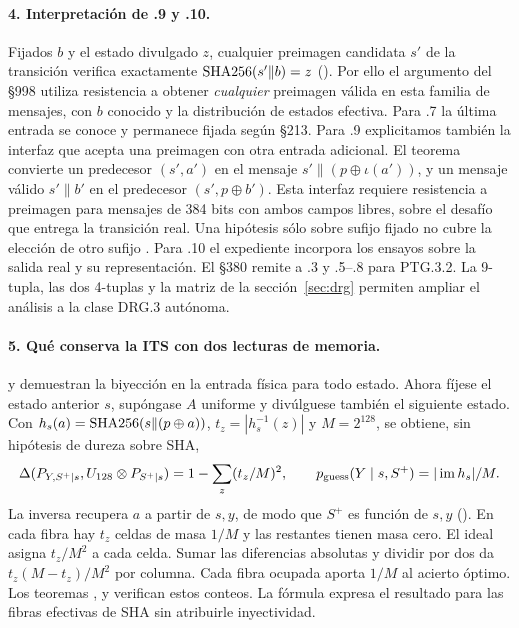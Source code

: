 \paragraph{4. Interpretación de .9 y .10.}
Fijados \(b\) y el estado divulgado \(z\), cualquier preimagen candidata
\(s'\) de la transición verifica exactamente \(\operatorname{SHA256}(s'\|b)=z\)
(). Por ello el argumento del §998 utiliza
resistencia a obtener \emph{cualquier} preimagen válida en esta familia
de mensajes, con \(b\) conocido y la distribución de estados efectiva.
Para .7 la última entrada se conoce y permanece fijada según §213.
Para .9 explicitamos también la interfaz que acepta una preimagen con
otra entrada adicional. El teorema  convierte
un predecesor \((s',a')\) en el mensaje \(s'\|(p\oplus\iota(a'))\),
y un mensaje válido \(s'\|b'\) en el predecesor
\((s',p\oplus b')\). Esta interfaz requiere resistencia a preimagen
para mensajes de 384 bits con ambos campos libres, sobre el desafío
que entrega la transición real. Una hipótesis sólo sobre sufijo fijado
no cubre la elección de otro sufijo \cite[§§212--215]{ais}.
Para .10 el expediente incorpora los ensayos sobre la salida real y su
representación. El §380 remite a .3 y .5--.8 para PTG.3.2.
La 9-tupla, las dos 4-tuplas y la matriz de la sección~\ref{sec:drg}
permiten ampliar el análisis a la clase DRG.3 autónoma.

\paragraph{5. Qué conserva la ITS con dos lecturas de memoria.}
 y  demuestran la biyección en
la entrada física para todo estado. Ahora fíjese el estado anterior \(s\),
supóngase \(A\) uniforme y divúlguese también el siguiente estado.
Con \(h_s(a)=\operatorname{SHA256}(s\|(p\oplus a))\), \(t_z=|h_s^{-1}(z)|\) y \(M=2^{128}\),
se obtiene, sin hipótesis de dureza sobre SHA,
\[
  \Delta(P_{Y,S^+\mid s}, U_{128}\otimes P_{S^+\mid s})
  =1-\sum_z (t_z/M)^2,\qquad
  p_{\mathrm{guess}}(Y\mid s,S^+)=|\operatorname{im}h_s|/M .
\]
La inversa recupera \(a\) a partir de \(s,y\), de modo que \(S^+\) es función de
\(s,y\) (). En cada fibra hay \(t_z\) celdas de masa
\(1/M\) y las restantes tienen masa cero. El ideal asigna \(t_z/M^2\)
a cada celda. Sumar las diferencias absolutas y dividir por dos da
\(t_z(M-t_z)/M^2\) por columna. Cada fibra ocupada aporta \(1/M\) al acierto
óptimo. Los teoremas ,
 y  verifican
estos conteos. La fórmula expresa el resultado para las fibras efectivas
de SHA sin atribuirle inyectividad.
